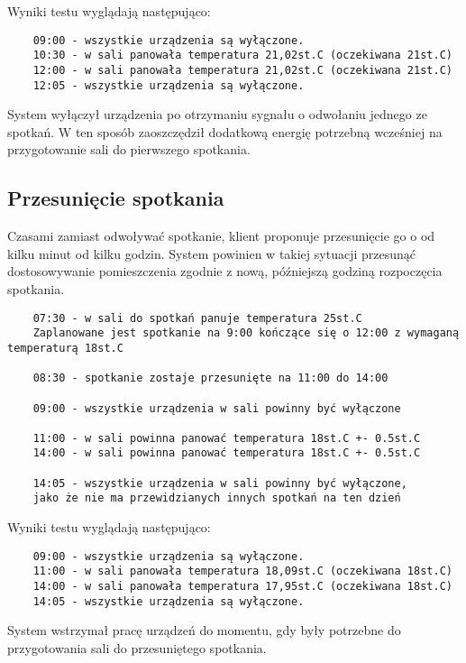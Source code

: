 Wyniki testu wyglądają następująco:
\begin{lstlisting}
    09:00 - wszystkie urządzenia są wyłączone.
    10:30 - w sali panowała temperatura 21,02st.C (oczekiwana 21st.C)
    12:00 - w sali panowała temperatura 21,02st.C (oczekiwana 21st.C)
    12:05 - wszystkie urządzenia są wyłączone.
\end{lstlisting}
System wyłączył urządzenia po otrzymaniu sygnału o odwołaniu jednego ze spotkań. W ten sposób zaoszczędził dodatkową energię potrzebną wcześniej na przygotowanie sali do pierwszego spotkania. 

\subsection{Przesunięcie spotkania}
Czasami zamiast odwoływać spotkanie, klient proponuje przesunięcie go o od kilku minut od kilku godzin. System powinien w takiej sytuacji przesunąć dostosowywanie pomieszczenia zgodnie z nową, późniejszą godziną rozpoczęcia spotkania.
\begin{lstlisting}
    07:30 - w sali do spotkań panuje temperatura 25st.C
    Zaplanowane jest spotkanie na 9:00 kończące się o 12:00 z wymaganą temperaturą 18st.C
        
    08:30 - spotkanie zostaje przesunięte na 11:00 do 14:00

    09:00 - wszystkie urządzenia w sali powinny być wyłączone
    
    11:00 - w sali powinna panować temperatura 18st.C +- 0.5st.C
    14:00 - w sali powinna panować temperatura 18st.C +- 0.5st.C
    
    14:05 - wszystkie urządzenia w sali powinny być wyłączone, 
    jako że nie ma przewidzianych innych spotkań na ten dzień
\end{lstlisting}

Wyniki testu wyglądają następująco:
\begin{lstlisting}
    09:00 - wszystkie urządzenia są wyłączone.
    11:00 - w sali panowała temperatura 18,09st.C (oczekiwana 18st.C)
    14:00 - w sali panowała temperatura 17,95st.C (oczekiwana 18st.C)
    14:05 - wszystkie urządzenia są wyłączone.
\end{lstlisting}
System wstrzymał pracę urządzeń do momentu, gdy były potrzebne do przygotowania sali do przesuniętego spotkania.

